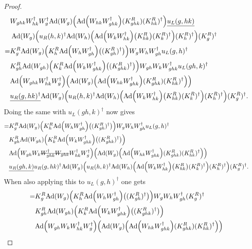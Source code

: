 \documentclass[12pt,a4paper,twoside]{article}
\numberwithin{equation}{section}
\begin{document}
\begin{proof}
\begin{align}
		\nonumber
		&W_{ghk}W_{hk}^\dagger W_{g}^\dagger \Ad{W_g}\left( \Ad{W_{hk}W_{ghk}^\dagger}(K^R_{ghk})(K^R_{hk})^{\dagger} \right)\underline{u_L(g,hk)}\\
		\nonumber
		&\:\Ad{W_g}\left(u_R(h,k)^\dagger \Ad{W_h}\left(\Ad{W_kW_{hk}^\dagger}\left(K_{hk}^R\right)(K^R_k)^\dagger\right)(K^R_h)^\dagger\right)(K^R_g)^\dagger\\
		=&K_g^R\Ad{W_g}\left(K_h^R\Ad{W_hW_{gh}^\dagger}\left((K_{gh}^R)^\dagger\right)\right)W_gW_hW_{gh}^\dagger u_L(g,h)^\dagger\\
		\nonumber
		&K_{gh}^R\Ad{W_{gh}}\left(K_k^R\Ad{W_kW_{ghk}^\dagger}\left((K_{ghk}^R)^\dagger\right)\right) W_{gh}W_kW_{ghk}^\dagger u_L(gh,k)^\dagger\\
		\nonumber
		&\Ad{W_{ghk}W_{hk}^\dagger W_{g}^\dagger}  \left(\Ad{W_g}\left( \Ad{W_{hk}W_{ghk}^\dagger}(K^R_{ghk})(K^R_{hk})^{\dagger} \right)\right)\\
		\nonumber
		&\underline{u_R(g,hk)^\dagger}\Ad{W_g}\left(u_R(h,k)^\dagger \Ad{W_h}\left(\Ad{W_kW_{hk}^\dagger}\left(K_{hk}^R\right)(K^R_k)^\dagger\right)(K^R_h)^\dagger\right)(K^R_g)^\dagger.
	\end{align}
	Doing the same with $u_L(gh,k)^\dagger$ now gives
	\begin{align}
		=&K_g^R\Ad{W_g}\left(K_h^R\Ad{W_hW_{gh}^\dagger}\left((K_{gh}^R)^\dagger\right)\right)W_gW_hW_{gh}^\dagger u_L(g,h)^\dagger\\
		\nonumber
		&K_{gh}^R\Ad{W_{gh}}\left(K_k^R\Ad{W_kW_{ghk}^\dagger}\left((K_{ghk}^R)^\dagger\right)\right)  \\
		\nonumber
		&\Ad{W_{gh}W_k\stkout{W_{ghk}^\dagger W_{ghk}}W_{hk}^\dagger W_{g}^\dagger}  \left(\Ad{W_g}\left( \Ad{W_{hk}W_{ghk}^\dagger}(K^R_{ghk})(K^R_{hk})^{\dagger} \right)\right)\\
		\nonumber
		&\underline{u_R(gh,k)}u_R(g,hk)^\dagger\Ad{W_g}\left(u_R(h,k)^\dagger \Ad{W_h}\left(\Ad{W_kW_{hk}^\dagger}\left(K_{hk}^R\right)(K^R_k)^\dagger\right)(K^R_h)^\dagger\right)(K^R_g)^\dagger.
	\end{align}
	When also applying this to $u_L(g,h)^\dagger$ one gets
	\begin{align}
		=&K_g^R\Ad{W_g}\left(K_h^R\Ad{W_hW_{gh}^\dagger}\left((K_{gh}^R)^\dagger\right)\right)W_gW_hW_{gh}^\dagger (K^R_g)^\dagger\\
		\nonumber
		&K_{gh}^R\Ad{W_{gh}}\left(K_k^R\Ad{W_kW_{ghk}^\dagger}\left((K_{ghk}^R)^\dagger\right)\right)\\
		\nonumber
		&\Ad{W_{gh}W_kW_{hk}^\dagger W_{g}^\dagger}  \left(\Ad{W_g}\left( \Ad{W_{hk}W_{ghk}^\dagger}(K^R_{ghk})(K^R_{hk})^{\dagger} \right)\right)\\

\end{align}
\end{proof}
\end{document}
